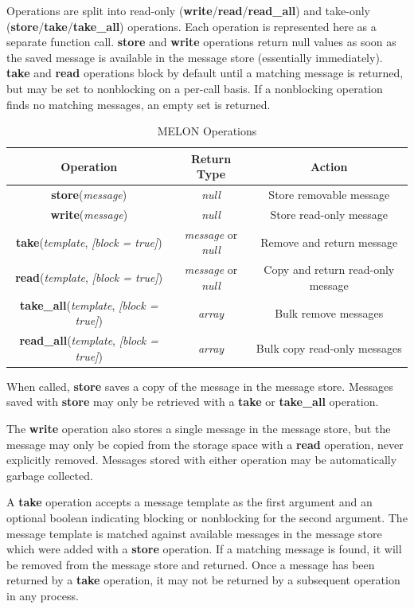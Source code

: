 \documentclass{llncs}
\begin{document}
Operations are split into read-only (\textbf{write}/\textbf{read}/\textbf{read\_all}) and take-only (\textbf{store}/\textbf{take}/\textbf{take\_all}) operations. Each operation is represented here as a separate function call. \textbf{store} and \textbf{write} operations return null values as soon as the saved message is available in the message store (essentially immediately). \textbf{take} and \textbf{read} operations block by default until a matching message is returned, but may be set to nonblocking on a per-call basis. If a nonblocking operation finds no matching messages, an empty set is returned.

\begin{table}
\centering
\caption{MELON Operations}
\begin{tabular}{|c|c|c|}
\hline
\textbf{Operation} & \textbf{Return Type} & \textbf{Action} \\ \hline
\textbf{store}(\textit{message}) & \textit{null} & Store removable message \\ \hline
\textbf{write}(\textit{message}) & \textit{null} & Store read-only message \\ \hline
\textbf{take}(\textit{template}, \textit{[block = true]}) & \textit{message} or \textit{null} & Remove and return message \\ \hline
\textbf{read}(\textit{template}, \textit{[block = true]}) & \textit{message} or \textit{null} & Copy and return read-only message \\ \hline
\textbf{take\_all}(\textit{template}, \textit{[block = true]}) & \textit{array} & Bulk remove messages \\ \hline
\textbf{read\_all}(\textit{template}, \textit{[block = true]}) & \textit{array} & Bulk copy read-only messages \\ \hline
\end{tabular}
\end{table}

When called, \textbf{store} saves a copy of the message in the message store. Messages saved with \textbf{store} may only be retrieved with a \textbf{take} or \textbf{take\_all} operation.

The \textbf{write} operation also stores a single message in the message store, but the message may only be copied from the storage space with a \textbf{read} operation, never explicitly removed. Messages stored with either operation may be automatically garbage collected.

A \textbf{take} operation accepts a message template as the first argument and an optional boolean indicating blocking or nonblocking for the second argument. The message template is matched against available messages in the message store which were added with a \textbf{store} operation. If a matching message is found, it will be removed from the message store and returned. Once a message has been returned by a \textbf{take} operation, it may not be returned by a subsequent operation in any process.
\end{document}
